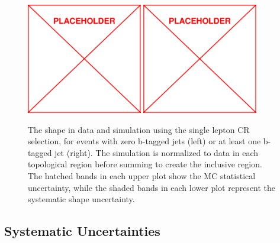 \begin{figure}
	\centering
	\includegraphics[width=0.45\textwidth]{figs/placeholder}
	\includegraphics[width=0.45\textwidth]{figs/placeholder}
	\caption{The \mttwo shape in data and simulation using the single lepton CR selection, for events with zero b-tagged jets (left) or at least one b-tagged jet (right). The simulation is normalized to data in each topological region before summing to create the inclusive region. The hatched bands in each upper plot show the MC statistical uncertainty, while the shaded bands in each lower plot represent the systematic shape uncertainty.}
	\label{fig:lostlepHybrid}
\end{figure}

\subsection{Systematic Uncertainties}
\label{subsec:lostlepSyst}

